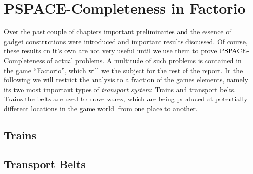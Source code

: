 \chapter{PSPACE-Completeness in Factorio}

	Over the past couple of chapters important preliminaries and the essence of gadget constructions were introduced and important results discussed.
	Of course, these results on it's own are not very useful until we use them to prove $\text{PSPACE}$-Completeness of actual problems.
	A multitude of such problems is contained in the game \enquote{Factorio}, which will we the subject for the rest of the report.
	In the following we will restrict the analysis to a fraction of the games elements, namely its two most important types of \textit{transport system}: Trains and transport belts.
	Trains the belts are used to move wares, which are being produced at potentially different locations in the game world, from one place to another.
	
	

	\section{Trains}
		
	\section{Transport Belts}